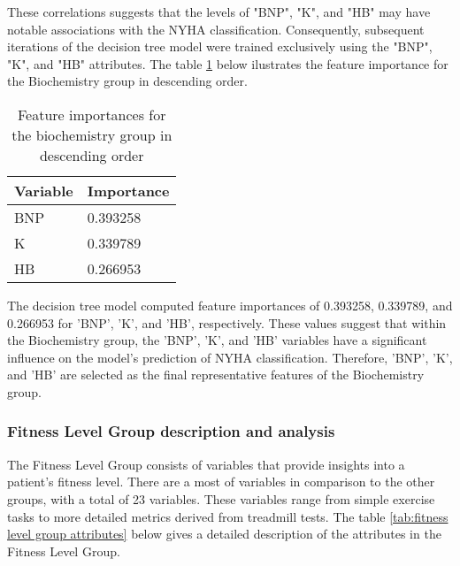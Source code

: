      These correlations suggests that the levels of "BNP", "K", and "HB" may have notable associations with the NYHA classification. Consequently, subsequent iterations of the decision tree model were trained exclusively using the "BNP", "K", and "HB" attributes. The table \ref{tab:biochemistry group feature importances} below ilustrates the feature importance for the Biochemistry group in descending order.

      \begin{table}[H]
        \centering
        \caption{Feature importances for the biochemistry group in descending order}
        \label{tab:biochemistry group feature importances}
        \begin{adjustbox}{center}
            \begin{tabular}{|l|l|}
                \hline
                \textbf{Variable} & \textbf{Importance} \\ \hline
                BNP               & 0.393258        \\
                K               & 0.339789        \\
                HB            & 0.266953         \\ \hline
                \end{tabular}
        \end{adjustbox}
    \end{table}

    The decision tree model computed feature importances of 0.393258, 0.339789, and 0.266953 for 'BNP', 'K', and 'HB', respectively. These values suggest that within the Biochemistry group, the 'BNP', 'K', and 'HB' variables have a significant influence on the model's prediction of NYHA classification. Therefore, 'BNP', 'K', and 'HB' are selected as the final representative features of the Biochemistry group.

\subsubsection{Fitness Level Group description and analysis}

The Fitness Level Group consists of variables that provide insights into a patient's fitness level. There are a most of variables in comparison to the other groups, with a total of 23 variables.
These variables range from simple exercise tasks to more detailed metrics derived from treadmill tests. The table \ref{tab:fitness level group attributes} below gives a detailed description of the attributes in the Fitness Level Group.

